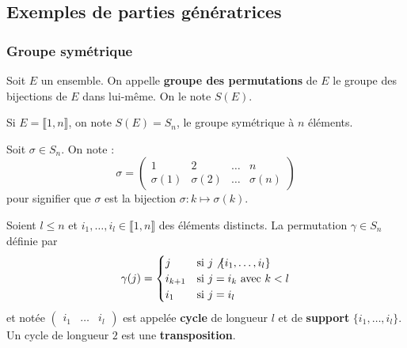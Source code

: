 	\newpage
	\subsection{Exemples de parties génératrices}
	
	\subsubsection{Groupe symétrique}
	
	
	\begin{definition}
		Soit $E$ un ensemble. On appelle \textbf{groupe des permutations} de $E$ le groupe des bijections de $E$ dans lui-même. On le note $S(E)$.
	\end{definition}
	
	\begin{notation}
		Si $E = \llbracket 1, n \rrbracket$, on note $S(E) = S_n$, le groupe symétrique à $n$ éléments.
	\end{notation}
	
	\begin{notation}
		Soit $\sigma \in S_n$. On note :
		\[
		\sigma =
		\begin{pmatrix}
			1 & 2 & \dots & n \\
			\sigma(1) & \sigma(2) & \dots & \sigma(n)
		\end{pmatrix}
		\]
		pour signifier que $\sigma$ est la bijection $\sigma : k \mapsto \sigma(k)$.
	\end{notation}
	
	\begin{definition}
		Soient $l \leq n$ et $i_1, \dots, i_l \in \llbracket 1, n \rrbracket$ des éléments distincts. La permutation $\gamma \in S_n$ définie par
		\[
		\gamma(j) =
		\begin{cases}
			j &\text{si } j \not \{ i_1, \dots, i_l \} \\
			i_{k+1} &\text{si } j = i_k \text{ avec } k<l \\
			i_1 &\text{si } j=i_l
		\end{cases}
		\]
		et notée $\begin{pmatrix} i_1 & \dots & i_l \end{pmatrix}$ est appelée \textbf{cycle} de longueur $l$ et de \textbf{support} $\{ i_1, \dots, i_l \}$. Un cycle de longueur $2$ est une \textbf{transposition}.
	\end{definition}
	
	
